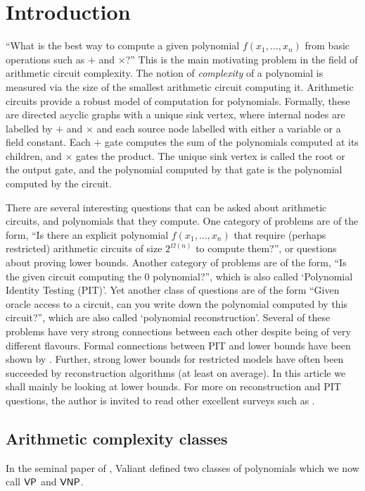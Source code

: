 \chapter{Introduction}\label{chap:intro}


``What is the best way to compute a given polynomial $f(x_1,\dots, x_n)$ from basic operations such as $+$ and $\times$?'' This is the main motivating problem in the field of arithmetic circuit complexity. 
The notion of \emph{complexity} of a polynomial is measured via the size of the smallest arithmetic circuit computing it. 
Arithmetic circuits provide a robust model of computation for polynomials. 
Formally, these are directed acyclic graphs with a unique sink vertex, where internal nodes are labelled by $+$ and $\times$ and each source node labelled with either a variable or a field constant. 
Each $+$ gate computes the sum of the polynomials computed at its children, and $\times$ gates the product. 
The unique sink vertex is called the root or the output gate, and the polynomial computed by that gate is the polynomial computed by the circuit. 

There are several interesting questions that can be asked about arithmetic circuits, and polynomials that they compute. 
One category of problems are of the form, ``Is there an explicit polynomial $f(x_1,\dots, x_n)$ that require (perhaps restricted) arithmetic circuits of size $2^{\Omega(n)}$ to compute them?'', or questions about proving lower bounds. 
Another category of problems are of the form, ``Is the given circuit computing the $0$ polynomial?'', which is also called `Polynomial Identity Testing (PIT)'. 
Yet another class of questions are of the form ``Given oracle access to a circuit, can you write down the polynomial computed by this circuit?'', which are also called `polynomial reconstruction'. 
Several of these problems have very strong connections between each other despite being of very different flavours. 
Formal connections between PIT and lower bounds have been shown by \cite{ki03,a05}. 
Further, strong lower bounds for restricted models have often been succeeded by reconstruction algorithms (at least on average). 
In this article we shall mainly be looking at lower bounds. 
For more on reconstruction and PIT questions, the author is invited to read other excellent surveys such as \cite{sy,ckw11}. 

\section{Arithmetic complexity classes}
In the seminal paper of \cite{v79}, Valiant defined two classes of polynomials which we now call $\mathsf{VP}$ and $\mathsf{VNP}$. 

